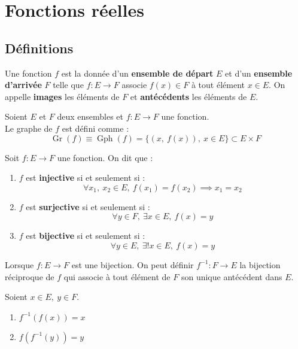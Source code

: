 \chapter{Fonctions réelles}
\def\arraystretch{1}

\section{Définitions}
\begin{definition}[Fonction]
	Une fonction $f$ est la donnée d'un \textbf{ensemble de départ} $E$ et d'un \textbf{ensemble d'arrivée} $F$ telle que 
	$ f : E \to F $
	associe $f(x) \in F$ à tout élément $x \in E$.
	On appelle \textbf{images} les éléments de $F$ et \textbf{antécédents} les éléments de $E$.
\end{definition}

\begin{definition}
	Soient $E$ et $F$ deux ensembles et $f : E \to F$ une fonction.
	\\
	Le graphe de $f$ est défini comme :
	\[ \operatorname{Gr}(f) \equiv \operatorname{Gph}(f) = \{ (x,\ f(x)),\ x \in E \} \subset E \times F \] 
\end{definition}

\begin{definition}
	Soit $f : E \to F$ une fonction. On dit que :
    \begin{enumerate}
        \item $f$ est \textbf{injective} si et seulement si : 
        \[ \forall x_1,\ x_2 \in E,\ f(x_1) = f(x_2) \implies x_1 = x_2 \]
        \item $f$ est \textbf{surjective} si et seulement si : 
        \[ \forall y \in F,\ \exists x \in E,\ f(x) = y \]
        \item $f$ est \textbf{bijective} si et seulement si :
        \[ \forall y \in E,\ \exists ! x \in E,\ f(x) = y \]
    \end{enumerate}
\end{definition}

\begin{definition}
	Lorsque $f : E \to F$ est une bijection. On peut définir $f^{-1} : F \to E$ la bijection réciproque de $f$ qui associe à tout élément de $F$ son unique antécédent dans $E$.
\end{definition}

\begin{proposition}
	Soient $x \in E,\ y \in F$.
    \begin{multicols}{2}
        \begin{enumerate}
            \item $f^{-1} (f(x)) = x$
            \item $f(f^{-1}(y)) = y$
        \end{enumerate}
    \end{multicols}
\end{proposition}

